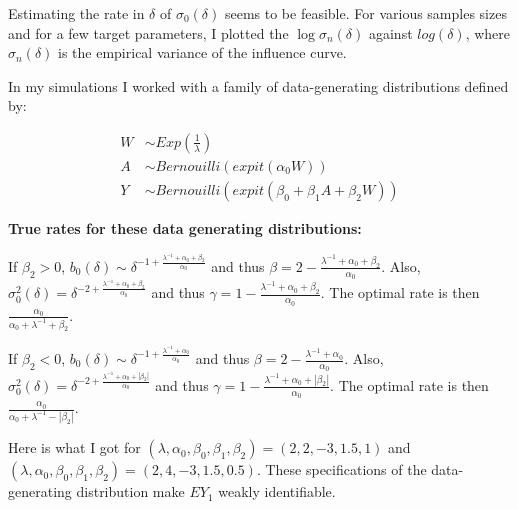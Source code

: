 \documentclass[a4paper]{article}
\begin{document}
Estimating the rate in $\delta$ of $\sigma_0(\delta)$ seems to be feasible. 
For various samples sizes and for a few target parameters, I plotted the $\log \sigma_n(\delta)$ against $log(\delta)$, where $\sigma_n(\delta)$ is the empirical variance of the influence curve.

In my simulations I worked with a family of data-generating distributions defined by:

\begin{align*}
W &\sim Exp\left(\frac{1}{\lambda} \right)\\
A &\sim Bernouilli(expit(\alpha_0 W)) \\
Y &\sim Bernouilli(expit(\beta_0 + \beta_1 A+ \beta_2 W))
\end{align*}

\textbf{True rates for these data generating distributions:}

If $\beta_2 > 0$, $b_0(\delta) \sim \delta^{-1 + \frac{\lambda^{-1} + \alpha_0 + \beta_2}{\alpha_0}}$ and thus $\beta = 2 - \frac{\lambda^{-1} + \alpha_0 + \beta_2}{\alpha_0}$. Also, $\sigma_0^2(\delta) = \delta^{-2 + \frac{\lambda^{-1} + \alpha_0 + \beta_2}{\alpha_0}}$ and thus $\gamma = 1 - \frac{\lambda^{-1} + \alpha_0 + \beta_2}{\alpha_0}$.
The optimal rate is then $\frac{\alpha_0}{\alpha_0 + \lambda^{-1} + \beta_2}$.

If $\beta_2 < 0$, $b_0(\delta) \sim \delta^{-1 + \frac{\lambda^{-1} + \alpha_0}{\alpha_0}}$ and thus $\beta = 2 - \frac{\lambda^{-1} + \alpha_0}{\alpha_0}$. Also, $\sigma_0^2(\delta) = \delta^{-2 + \frac{\lambda^{-1} + \alpha_0 + |\beta_2|}{\alpha_0}}$ and thus $\gamma = 1 - \frac{\lambda^{-1} + \alpha_0 + |\beta_2|}{\alpha_0}$.
The optimal rate is then $\frac{\alpha_0}{\alpha_0 + \lambda^{-1} - |\beta_2|}$.

\bigskip

Here is what I got for $(\lambda, \alpha_0, \beta_0, \beta_1, \beta_2) = (2, 2, -3, 1.5, 1)$ and $(\lambda, \alpha_0, \beta_0, \beta_1, \beta_2) = (2, 4, -3, 1.5, 0.5)$. These specifications of the data-generating distribution make $EY_1$ weakly identifiable.
\end{document}
